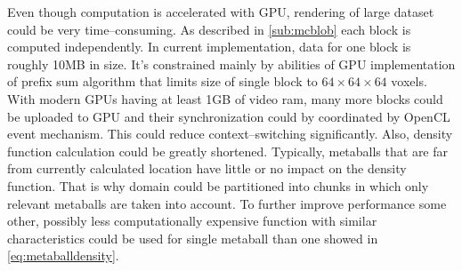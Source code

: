 Even though computation is accelerated with GPU, rendering of large dataset could
be very time--consuming. As described in \autoref{sub:mcblob} each block is
computed independently. In current implementation, data for one block
is roughly 10MB in size. It's constrained mainly by abilities of GPU implementation
of prefix sum algorithm that limits size of single block to $64\times 64\times 64$
voxels. With modern GPUs having at least 1GB of video ram, many more blocks
could be uploaded to GPU and their synchronization could by coordinated by
OpenCL event mechanism. This could reduce context--switching significantly.
Also, density function calculation could be greatly shortened. Typically,
metaballs that are far from currently calculated location have little or no
impact on the density function. That is why domain could be partitioned into chunks
in which only relevant metaballs are taken into account. To further improve
performance some other, possibly less computationally expensive function with
similar characteristics could be used for single metaball than one showed in
\autoref{eq:metaballdensity}.

